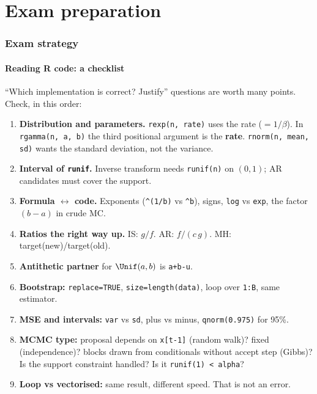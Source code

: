 \part{Exam preparation}

\section{Exam strategy}

\subsection{Reading R code: a checklist}
``Which implementation is correct? Justify'' questions are worth many points. Check, in this order:
\begin{enumerate}
  \item \textbf{Distribution and parameters.} \texttt{rexp(n, rate)} uses the rate ($=1/\beta$). In \texttt{rgamma(n, a, b)} the third positional argument is the \textbf{rate}. \texttt{rnorm(n, mean, sd)} wants the standard deviation, not the variance.
  \item \textbf{Interval of \texttt{runif}.} Inverse transform needs \texttt{runif(n)} on $(0,1)$; AR candidates must cover the support.
  \item \textbf{Formula $\leftrightarrow$ code.} Exponents (\texttt{\^{}(1/b)} vs \texttt{\^{}b}), signs, \texttt{log} vs \texttt{exp}, the factor $(b-a)$ in crude MC.
  \item \textbf{Ratios the right way up.} IS: $g/f$. AR: $f/(c\,g)$. MH: target(new)/target(old).
  \item \textbf{Antithetic partner} for $\Unif(a,b)$ is \texttt{a+b-u}.
  \item \textbf{Bootstrap:} \texttt{replace=TRUE}, \texttt{size=length(data)}, loop over \texttt{1:B}, same estimator.
  \item \textbf{MSE and intervals:} \texttt{var} vs \texttt{sd}, plus vs minus, \texttt{qnorm(0.975)} for 95\%.
  \item \textbf{MCMC type:} proposal depends on \texttt{x[t-1]} (random walk)? fixed (independence)? blocks drawn from conditionals without accept step (Gibbs)? Is the support constraint handled? Is it \texttt{runif(1) < alpha}?
  \item \textbf{Loop vs vectorised:} same result, different speed. That is not an error.
\end{enumerate}

